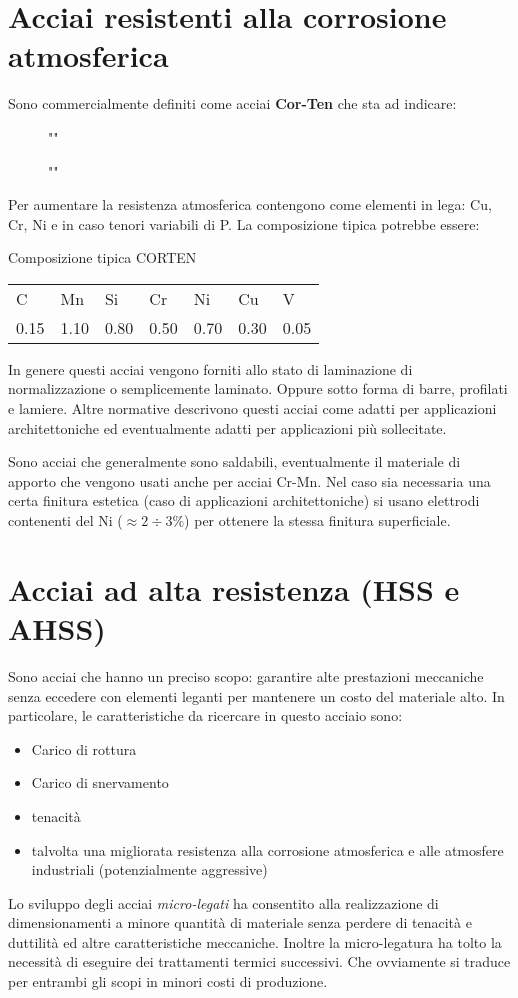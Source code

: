 \section{Acciai resistenti alla corrosione atmosferica}
Sono commercialmente definiti come acciai \textbf{Cor-Ten} che sta ad indicare:
\begin{description}
\item[] ""
\item[] ""
\end{description}

Per aumentare la resistenza atmosferica contengono come elementi in lega:
Cu, Cr, Ni e in caso tenori variabili di P.
La composizione tipica potrebbe essere:
\begin{example}{Composizione tipica CORTEN}
\begin{tabularx}{\textwidth}{XXXXXXX}
\toprule
C & Mn & Si & Cr & Ni & Cu & V\\
0.15 & 1.10 & 0.80 & 0.50 & 0.70 & 0.30 & 0.05\\
\bottomrule
\end{tabularx}
\end{example}
In genere questi acciai vengono forniti allo stato di laminazione di
normalizzazione o semplicemente laminato. Oppure sotto forma di barre, 
profilati e lamiere.
Altre normative descrivono questi acciai come adatti per applicazioni architettoniche ed eventualmente adatti per applicazioni più sollecitate.

Sono acciai che generalmente sono saldabili, eventualmente il materiale
di apporto che vengono usati anche per acciai Cr-Mn. Nel caso sia
necessaria una certa finitura estetica (caso di applicazioni
architettoniche) si usano elettrodi contenenti del Ni ($\approx 2 \div 
3\%$) per ottenere la stessa finitura superficiale.

\section{Acciai ad alta resistenza (HSS e AHSS)}
Sono acciai che hanno un preciso scopo: garantire alte prestazioni 
meccaniche senza eccedere con elementi leganti per mantenere un costo 
del materiale alto.
In particolare, le caratteristiche da ricercare in questo acciaio sono:
\begin{itemize}
\item Carico di rottura
\item Carico di snervamento
\item tenacità
\item talvolta una migliorata resistenza alla corrosione 
atmosferica e alle atmosfere industriali (potenzialmente 
aggressive)
\end{itemize}
Lo sviluppo degli acciai \textit{micro-legati} ha consentito
alla realizzazione di dimensionamenti a minore quantità di materiale
senza perdere di tenacità e duttilità ed altre caratteristiche
meccaniche.
Inoltre la micro-legatura ha tolto la necessità di
eseguire dei trattamenti termici successivi. Che ovviamente
si traduce per entrambi gli scopi in minori costi di produzione.

